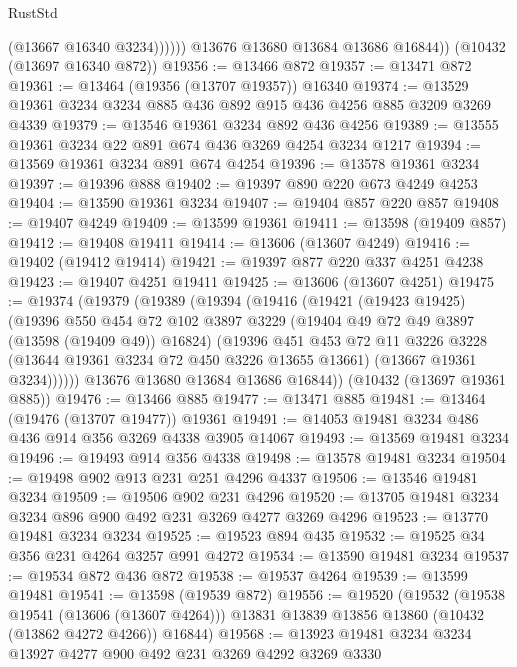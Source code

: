 \begin{lexlean}{RustStd}
\begin{coremodule}
                  (@13667 @16340 @3234))))))
        @13676
        @13680
        @13684
        @13686
        @16844))
    (@10432 (@13697 @16340 @872))
@19356 := @13466 @872
@19357 := @13471 @872
@19361 := @13464 (@19356 (@13707 @19357)) @16340
@19374 := @13529 @19361 @3234 @3234 @885 @436 @892 @915 @436 @4256 @885 @3209 @3269 @4339
@19379 := @13546 @19361 @3234 @892 @436 @4256
@19389 := @13555 @19361 @3234 @22 @891 @674 @436 @3269 @4254 @3234 @1217
@19394 := @13569 @19361 @3234 @891 @674 @4254
@19396 := @13578 @19361 @3234
@19397 := @19396 @888
@19402 := @19397 @890 @220 @673 @4249 @4253
@19404 := @13590 @19361 @3234
@19407 := @19404 @857 @220 @857
@19408 := @19407 @4249
@19409 := @13599 @19361
@19411 := @13598 (@19409 @857)
@19412 := @19408 @19411
@19414 := @13606 (@13607 @4249)
@19416 := @19402 (@19412 @19414)
@19421 := @19397 @877 @220 @337 @4251 @4238
@19423 := @19407 @4251 @19411
@19425 := @13606 (@13607 @4251)
@19475 := @19374
    (@19379
      (@19389
        (@19394
          (@19416
            (@19421
              (@19423 @19425)
              (@19396
                @550
                @454
                @72
                @102
                @3897
                @3229
                (@19404 @49 @72 @49 @3897 (@13598 (@19409 @49)) @16824)
                (@19396
                  @451
                  @453
                  @72
                  @11
                  @3226
                  @3228
                  (@13644 @19361 @3234 @72 @450 @3226 @13655 @13661)
                  (@13667 @19361 @3234))))))
        @13676
        @13680
        @13684
        @13686
        @16844))
    (@10432 (@13697 @19361 @885))
@19476 := @13466 @885
@19477 := @13471 @885
@19481 := @13464 (@19476 (@13707 @19477)) @19361
@19491 := @14053 @19481 @3234 @486 @436 @914 @356 @3269 @4338 @3905 @14067
@19493 := @13569 @19481 @3234
@19496 := @19493 @914 @356 @4338
@19498 := @13578 @19481 @3234
@19504 := @19498 @902 @913 @231 @251 @4296 @4337
@19506 := @13546 @19481 @3234
@19509 := @19506 @902 @231 @4296
@19520 := @13705 @19481 @3234 @3234 @896 @900 @492 @231 @3269 @4277 @3269 @4296
@19523 := @13770 @19481 @3234 @3234
@19525 := @19523 @894 @435
@19532 := @19525 @34 @356 @231 @4264 @3257 @991 @4272
@19534 := @13590 @19481 @3234
@19537 := @19534 @872 @436 @872
@19538 := @19537 @4264
@19539 := @13599 @19481
@19541 := @13598 (@19539 @872)
@19556 := @19520
    (@19532
      (@19538 @19541 (@13606 (@13607 @4264)))
      @13831
      @13839
      @13856
      @13860
      (@10432 (@13862 @4272 @4266))
      @16844)
@19568 := @13923 @19481 @3234 @3234 @13927 @4277 @900 @492 @231 @3269 @4292 @3269 @3330

\end{coremodule}
\end{lexlean}
